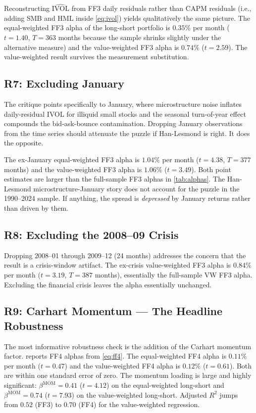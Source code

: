 \documentclass[12pt]{article}
\newcommand{\1}[1]{\mathds{1}\left[#1\right]}
\begin{document}
Reconstructing $\widehat{\mathrm{IVOL}}$ from FF3 daily residuals rather than
CAPM residuals (i.e., adding SMB and HML inside \eqref{eq:ivol}) yields
qualitatively the same picture. The equal-weighted FF3 alpha of the long-short
portfolio is $0.35\%$ per month ($t=1.40$, $T=363$ months because the sample
shrinks slightly under the alternative measure) and the value-weighted FF3
alpha is $0.74\%$ ($t=2.59$). The value-weighted result survives the
\citet{fu2009idiosyncratic} measurement substitution.

\subsection{R7: Excluding January}

The \citet{han2011investor} critique points specifically to January, where
microstructure noise inflates daily-residual IVOL for illiquid small stocks
and the seasonal turn-of-year effect compounds the bid-ask-bounce contamination.
Dropping January observations from the time series should attenuate the
puzzle if Han-Lesmond is right. It does the opposite.

The ex-January equal-weighted FF3 alpha is $1.04\%$ per month
($t=4.38$, $T=377$ months) and the value-weighted FF3 alpha is $1.06\%$
($t=3.49$). Both point estimates are larger than the full-sample FF3 alphas
in \cref{tab:alphas}. The Han-Lesmond microstructure-January story does not
account for the puzzle in the 1990--2024 sample. If anything, the spread is
\emph{depressed} by January returns rather than driven by them.

\subsection{R8: Excluding the 2008--09 Crisis}

Dropping 2008--01 through 2009--12 (24 months) addresses the concern that
the result is a crisis-window artifact. The ex-crisis value-weighted FF3
alpha is $0.84\%$ per month ($t=3.19$, $T=387$ months), essentially the
full-sample VW FF3 alpha. Excluding the financial crisis leaves the alpha
essentially unchanged.

\subsection{R9: Carhart Momentum --- The Headline Robustness}

The most informative robustness check is the addition of the Carhart momentum
factor.  reports FF4 alphas from \eqref{eq:ff4}. The equal-weighted
FF4 alpha is $0.11\%$ per month ($t=0.47$) and the value-weighted FF4
alpha is $0.12\%$ ($t=0.61$). Both are within one standard error of zero. The
momentum loading is large and highly significant: $\beta^{\mathrm{MOM}} = 0.41$
($t=4.12$) on the equal-weighted long-short and $\beta^{\mathrm{MOM}} = 0.74$
($t=7.93$) on the value-weighted long-short. Adjusted $R^2$ jumps from
$0.52$ (FF3) to $0.70$ (FF4) for the value-weighted regression.
\end{document}

